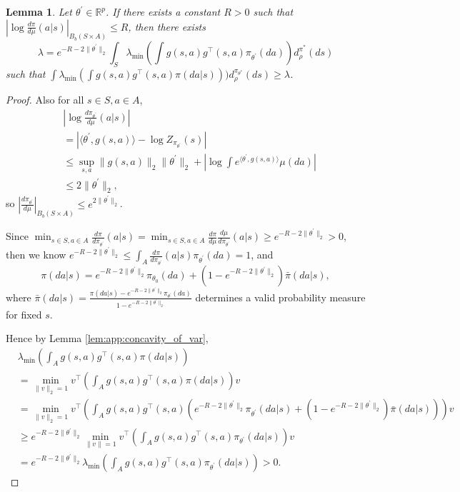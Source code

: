 \documentclass{amsart}
\newtheorem{lemma}[theorem]{Lemma}
\theoremstyle{definition}
\begin{document}
\begin{lemma}\label{lem:app:mdp:lower_bound_log_density_simplex}
Let $\theta^\prime \in \mathbb{R}^p$.
If there exists a constant $R > 0$ such that $\left|\log \frac{d\pi}{d\mu}(a|s)\right|_{B_b({S \times A})} \leq  R$, then there exists 
\[
\lambda =  e^{-R - 2\|\theta^\prime\|_2} \int_{S}  \lambda_{\min}\left(\int g(s,a)g^\top(s,a)\pi_{\theta^\prime} (da)\right)d^{\pi^*}_\rho(ds)
\]
such that $\int\lambda_{\min} \left(\int g(s,a)g^\top(s,a)\pi (da | s)\right))d_\rho^{\pi_{\theta^*}}(ds) \geq \lambda$.
\end{lemma}
\begin{proof}

Also for all $s \in S, a \in A$,
\begin{align*}
&\left|\log\frac{d \pi_{\theta^\prime}}{d \mu}(a|s)\right|\\
& = \left| \langle \theta^\prime, g(s,a)\rangle - \log Z_{\pi_{\theta^\prime}}(s)\right| \\
& \leq \sup_{s,a}\|g(s,a)\|_2\|\theta^\prime\|_2 + \left|\log \int e^{\langle \theta^\prime,g(s,a)\rangle}\mu(da)\right|\\
& \leq 2\|\theta^\prime\|_2,
\end{align*}
so $\left|\frac{d \pi_{\theta^\prime}}{d \mu}\right|_{B_b(S \times A)} \leq e^{2\|\theta^\prime\|_2}$.

Since $\min_{s \in S, a\in A} \frac{d\pi}{d\pi_{\theta^\prime}}(a|s) = \min_{s \in S, a\in A} \frac{d\pi}{d\mu} \frac{d\mu}{d \pi_{\theta^\prime}}(a|s) \geq e^{-R - 2\|\theta^\prime\|_2} >0$, then we know $e^{-R - 2\|\theta^\prime\|_2} \leq \int_{A} \frac{d\pi}{d \pi_{\theta^\prime}}(a|s)\pi_{\theta^\prime}(da) = 1$, and
\[
\pi(da|s) = e^{-R - 2\|\theta^\prime\|_2} \pi_{\theta_{0}}(da) + \left(1-e^{-R - 2\|\theta^\prime\|_2}\right) \bar{\pi}(da|s),
\]
where $\bar{\pi}(da|s) = \frac{\pi(da|s)- e^{-R - 2\|\theta^\prime\|_2}\pi_{\theta^\prime}(da)}{1-e^{-R - 2\|\theta^\prime\|_2}}$ determines a valid probability measure for fixed $s$. 

Hence by Lemma \ref{lem:app:concavity_of_var},
\begin{align*}
&\lambda_{\min}\left(\int_{A} g(s,a)g^\top(s,a)\pi(da|s)\right)\\
& = \min_{\|v\|_2 = 1} v^\top \left(\int_{A} g(s,a)g^\top(s,a)\pi(da|s)\right) v\\
& = \min_{\|v\|_2 = 1} v^\top \left(\int_{A} g(s,a)g^\top(s,a) \left(e^{-R - 2\|\theta^\prime\|_2}\pi_{\theta^\prime}(da | s) + \left(1-e^{-R - 2\|\theta^\prime\|_2}\right) \bar{\pi}(da|s)\right)\right) v\\
& \geq e^{-R - 2\|\theta^\prime\|_2} \min_{\|v\| = 1} v^\top \left(\int_{A} g(s,a)g^\top(s,a) \pi_{\theta^\prime}(da | s)\right) v \\
& = e^{-R - 2\|\theta^\prime\|_2} \lambda_{\min}\left(\int_{A} g(s,a)g^\top(s,a)\pi_{\theta^\prime} (da | s)\right)>0.
\end{align*}
\end{proof}
\end{document}
